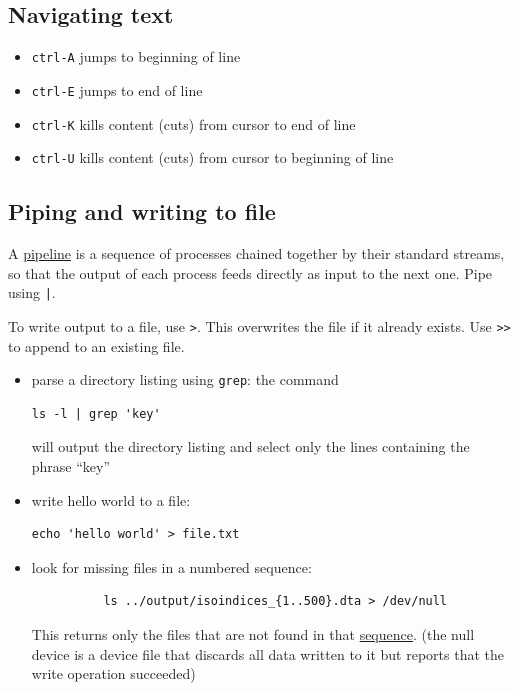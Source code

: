 \subsection{Navigating text}

\begin{itemize}
	\item \texttt{ctrl-A} jumps to beginning of line
	\item \texttt{ctrl-E} jumps to end of line
	\item \texttt{ctrl-K} kills content (cuts) from cursor to end of line
	\item \texttt{ctrl-U} kills content (cuts) from cursor to beginning of line
\end{itemize}

\subsection{Piping and writing to file}
A \href{https://en.wikipedia.org/wiki/Pipeline_(Unix)}{pipeline} is a sequence of processes chained together by their standard streams, so that the output of each process feeds directly as input to the next one.
Pipe using \texttt{|}.

To write output to a file, use \texttt{>}.
This overwrites the file if it already exists.
Use \texttt{>>} to append to an existing file.


\begin{itemize}
	\item parse a directory listing using \texttt{grep}: the command
	\begin{verbatim}ls -l | grep 'key'\end{verbatim}
	will output the directory listing and select only the lines containing the phrase ``key''
	\item write hello world to a file:
	\begin{verbatim}echo 'hello world' > file.txt\end{verbatim}
	\item look for missing files in a numbered sequence:
		  \begin{verbatim}
		  ls ../output/isoindices_{1..500}.dta > /dev/null
		  \end{verbatim}
		  This returns only the files that are not found in that \href{http://www.thelinuxrain.com/articles/building-sequences-of-numbers-on-the-command-line}{sequence}.
		  (the null device is a device file that discards all data written to it but reports that the write operation succeeded)
\end{itemize}

